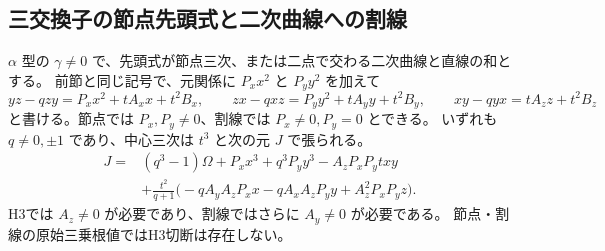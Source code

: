 \subsection{三交換子の節点先頭式と二次曲線への割線}
\label{subsec:cubic-CY-three-alpha-nodal-secant}

\begin{proposition}\label{prop:cubic-CY-three-alpha-nodal-secant-center}
$\alpha$ 型の $\gamma\ne0$ で、先頭式が節点三次、または二点で交わる二次曲線と直線の和とする。
前節と同じ記号で、元関係に $P_xx^2$ と $P_yy^2$ を加えて
\[
 yz-qzy=P_x x^2+tA_x x+t^2 B_x,\qquad
 zx-qxz=P_y y^2+tA_y y+t^2 B_y,\qquad
 xy-qyx=tA_z z+t^2 B_z
\]
と書ける。節点では $P_x,P_y\ne0$、割線では $P_x\ne0,P_y=0$ とできる。
いずれも $q\ne0,\pm1$ であり、中心三次は $t^3$ と次の元 $J$ で張られる。
\begin{align*}
 J={}&(q^3-1)\Omega+P_x x^3+q^3P_y y^3-A_zP_xP_y txy\\
     &+\frac{t^2}{q+1}
         \bigl(-q A_yA_zP_xx-q A_xA_zP_yy+A_z^2P_xP_y z\bigr).
\end{align*}
H3では $A_z\ne0$ が必要であり、割線ではさらに $A_y\ne0$ が必要である。
節点・割線の原始三乗根値ではH3切断は存在しない。
\end{proposition}
